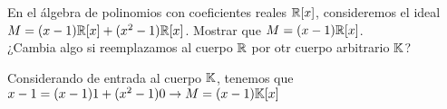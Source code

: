 \item En el álgebra de polinomios con coeficientes reales $\mathbb{R}[x]$, consideremos el ideal $M=(x-1)\mathbb{R}[x]+(x^2-1)\mathbb{R}[x]$. Mostrar que $M=(x-1)\mathbb{R}[x]$.\\
    ¿Cambia algo si reemplazamos al cuerpo $\mathbb{R}$ por otr cuerpo arbitrario $\mathbb{K}$?
    \begin{mdframed}[style=s]
        Considerando de entrada al cuerpo $\mathbb{K}$, tenemos que $x-1=(x-1)1+(x^2-1)0\to M=(x-1)\mathbb{K}[x]$
    \end{mdframed}
